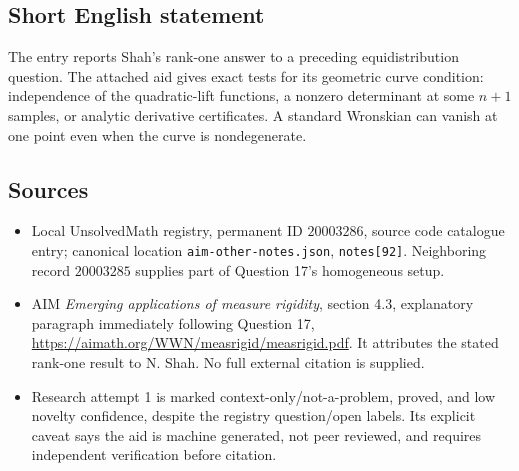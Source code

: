 \documentclass[11pt]{article}
\begin{document}
\subsection{Short English statement}
The entry reports Shah's rank-one answer to a preceding equidistribution question. The attached aid gives exact tests for its geometric curve condition: independence of the quadratic-lift functions, a nonzero determinant at some $n+1$ samples, or analytic derivative certificates. A standard Wronskian can vanish at one point even when the curve is nondegenerate.
\subsection{Sources}
\begin{itemize}
\item Local UnsolvedMath registry, permanent ID $20003286$, source code catalogue entry; canonical location \texttt{aim-other-notes.json}, \texttt{notes[92]}. Neighboring record $20003285$ supplies part of Question 17's homogeneous setup.
\item AIM \emph{Emerging applications of measure rigidity}, section 4.3, explanatory paragraph immediately following Question 17, \url{https://aimath.org/WWN/measrigid/measrigid.pdf}. It attributes the stated rank-one result to N. Shah. No full external citation is supplied.
\item Research attempt 1 is marked context-only/not-a-problem, proved, and low novelty confidence, despite the registry question/open labels. Its explicit caveat says the aid is machine generated, not peer reviewed, and requires independent verification before citation.
\end{itemize}
\end{document}
